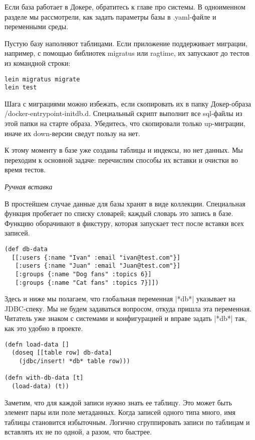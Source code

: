 Если база работает в Докере, обратитесь к главе про системы. В одноименном
разделе мы рассмотрели, как задать параметры базы в .yaml-файле и переменными
среды.

Пустую базу наполняют таблицами. Если приложение поддерживает миграции,
например, с помощью библиотек migratus или ragtime, их запускают до тестов из
командной строки:

\begin{verbatim}
lein migratus migrate
lein test
\end{verbatim}

Шага с миграциями можно избежать, если скопировать их в папку Докер-образа
/docker-entrypoint-initdb.d. Специальный скрипт выполнит все sql-файлы из этой
папки на старте образа. Убедитесь, что скопировали только up-миграции, иначе их
down-версии сведут пользу на нет.

К этому моменту в базе уже созданы таблицы и индексы, но нет данных. Мы
переходим к основной задаче: перечислим способы их вставки и очистки во время
тестов.

\emph{Ручная вставка}

В простейшем случае данные для базы хранят в виде коллекции. Специальная функция
пробегает по списку словарей; каждый словарь это запись в базе. Функцию
оборачивают в фикстуру, которая запускает тест после вставки всех записей.

\begin{verbatim}
(def db-data
  [[:users {:name "Ivan" :email "ivan@test.com"}]
   [:users {:name "Juan" :email "Juan@test.com"}]
   [:groups {:name "Dog fans" :topics 6}]
   [:groups {:name "Cat fans" :topics 7}]])
\end{verbatim}

Здесь и ниже мы полагаем, что глобальная переменная \spverb|*db*| указывает на
JDBC-спеку. Мы не будем задаваться вопросом, откуда пришла эта
переменная. Читатель уже знаком с системами и конфигурацией и вправе задать
\spverb|*db*| так, как это удобно в проекте.

\begin{verbatim}
(defn load-data []
  (doseq [[table row] db-data]
    (jdbc/insert! *db* table row)))

(defn with-db-data [t]
  (load-data) (t))
\end{verbatim}

Заметим, что для каждой записи нужно знать ее таблицу. Это может быть элемент
пары или поле метаданных. Когда записей одного типа много, имя таблицы
становится избыточным. Логично сгруппировать записи по таблицам и вставлять их
не по одной, а разом, что быстрее.

